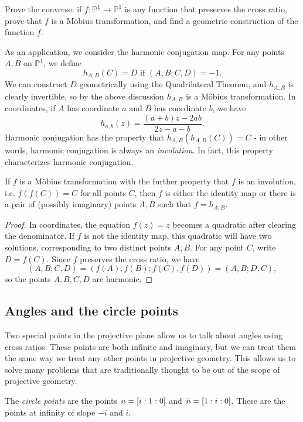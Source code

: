 \begin{exer} Prove the converse: if $f:\mathbb{P}^1 \rightarrow \mathbb{P}^1$ is any function that preserves the cross ratio, prove that $f$ is a M\"obius transformation, and find a geometric construction of the function $f$.
\end{exer}

As an application, we consider the harmonic conjugation map. For any points $A,B$ on $\mathbb{P}^1$, we define
\[
h_{A,B}(C) = D\mbox{ if }(A,B;C,D) = -1.
\]
We can construct $D$ geometrically using the Quadrilateral Theorem, and $h_{A,B}$ is clearly invertible, so by the above discussion $h_{A,B}$ is a M\"obius transformation. In coordinates, if $A$ has coordinate $a$ and $B$ has coordinate $b$, we have
\[
h_{a,b}(z) = \frac{(a+b)z-2ab}{2z-a-b}.
\]
Harmonic conjugation has the property that $h_{A,B}(h_{A,B}(C)) = C$ - in other words, harmonic conjugation is always an \emph{involution}. In fact, this property characterizes harmonic conjugation.

\begin{thm} If $f$ is a M\"obius transformation with the further property that $f$ is an involution, i.e. $f(f(C)) = C$ for all points $C$, then $f$ is either the identity map or there is a pair of (possibly imaginary) points $A,B$ such that $f = h_{A,B}$.
\end{thm}
\begin{proof} In coordinates, the equation $f(z) = z$ becomes a quadratic after clearing the denominator. If $f$ is not the identity map, this quadratic will have two solutions, corresponding to two distinct points $A,B$. For any point $C$, write $D = f(C)$. Since $f$ preserves the cross ratio, we have
\[
(A,B;C,D) = (f(A),f(B);f(C),f(D)) = (A,B;D,C),
\]
so the points $A,B,C,D$ are harmonic.
\end{proof}

\subsection{Angles and the circle points}

Two special points in the projective plane allow us to talk about angles using cross ratios. These points are both infinite and imaginary, but we can treat them the same way we treat any other points in projective geometry. This allows us to solve many problems that are traditionally thought to be out of the scope of projective geometry.

\begin{defn} The \emph{circle points} are the points $\fish = [i:1:0]$ and $\bar\fish = [1:i:0]$. These are the points at infinity of slope $-i$ and $i$.
\end{defn}

